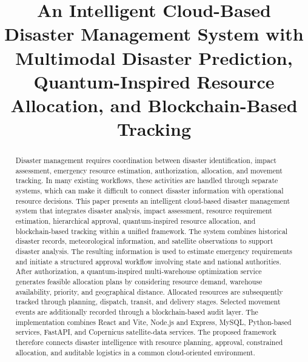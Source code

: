\documentclass[conference]{IEEEtran}
\begin{document}
\title{An Intelligent Cloud-Based Disaster Management System with Multimodal Disaster Prediction, Quantum-Inspired Resource Allocation, and Blockchain-Based Tracking}

\author{
}

\maketitle

\begin{abstract}
Disaster management requires coordination between disaster identification, impact assessment, emergency resource estimation, authorization, allocation, and movement tracking. In many existing workflows, these activities are handled through separate systems, which can make it difficult to connect disaster information with operational resource decisions. This paper presents an intelligent cloud-based disaster management system that integrates disaster analysis, impact assessment, resource requirement estimation, hierarchical approval, quantum-inspired resource allocation, and blockchain-based tracking within a unified framework. The system combines historical disaster records, meteorological information, and satellite observations to support disaster analysis. The resulting information is used to estimate emergency requirements and initiate a structured approval workflow involving state and national authorities. After authorization, a quantum-inspired multi-warehouse optimization service generates feasible allocation plans by considering resource demand, warehouse availability, priority, and geographical distance. Allocated resources are subsequently tracked through planning, dispatch, transit, and delivery stages. Selected movement events are additionally recorded through a blockchain-based audit layer. The implementation combines React and Vite, Node.js and Express, MySQL, Python-based services, FastAPI, and Copernicus satellite-data services. The proposed framework therefore connects disaster intelligence with resource planning, approval, constrained allocation, and auditable logistics in a common cloud-oriented environment.
\end{abstract}
\end{document}
